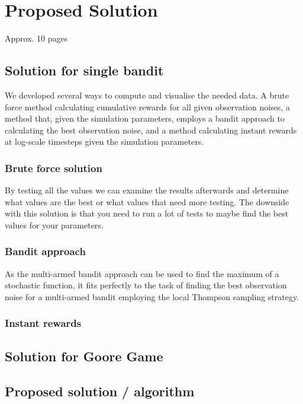 \chapter{Proposed Solution}
\label{ch:solution}
Approx. 10 pages

\section{Solution for single bandit}

We developed several ways to compute and visualise the needed data. A brute
force method calculating cumulative rewards for all given observation noises, a
method that, given the simulation parameters, employs a bandit approach to
calculating the best observation noise, and a method calculating instant
rewards at log-scale timesteps given the simulation parameters.

\subsection{Brute force solution}

By testing all the values we can examine the results afterwards and determine what
values are the best or what values that need more testing. The downside with this solution
is that you need to run a lot of tests to maybe find the best values for your
parameters.

\subsection{Bandit approach}

As the multi-armed bandit approach can be used to find the maximum of a
stochastic function, it fits perfectly to the task of finding the best
observation noise for a multi-armed bandit employing the local Thompson
sampling strategy.

\subsection{Instant rewards}


\section{Solution for Goore Game}




\section{Proposed solution / algorithm}

